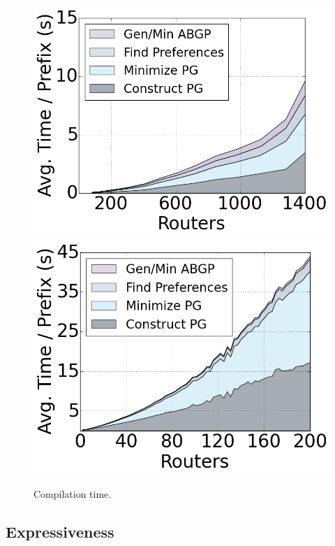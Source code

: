 \documentclass[10pt]{sigalternate052015} %
\providecommand{\DIFaddbegin}{} %
\providecommand{\DIFaddend}{} %
\providecommand{\DIFdelbegin}{} %
\providecommand{\DIFdelend}{} %
\begin{document}
\DIFdelbegin %
\DIFdelend \DIFaddbegin \begin{figure}
    {\includegraphics[width=.49\columnwidth]{figures/compilation-times-dc.png}}
    {\includegraphics[width=.49\columnwidth]{figures/compilation-times-backbone.png}} \\
  \caption{Compilation time. \label{fig:compilation-times}}
  \vspace{-1em}
\end{figure}
\DIFaddend 


\subsection{Expressiveness}
\end{document}
